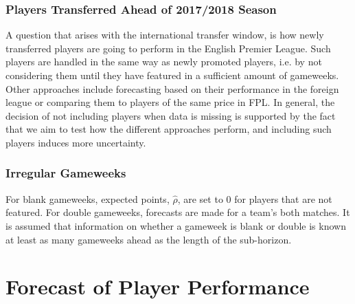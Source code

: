 \subsubsection{Players Transferred Ahead of 2017/2018 Season}
A question that arises with the international transfer window, is how newly transferred players are going to perform in the English Premier League. Such players are handled in the same way as newly promoted players, i.e. by not considering them until they have featured in a sufficient amount of gameweeks. Other approaches include forecasting based on their performance in the foreign league or comparing them to players of the same price in FPL. In general, the decision of not including players when data is missing is supported by the fact that we aim to test how the different approaches perform, and including such players induces more uncertainty. 



\subsubsection{Irregular Gameweeks}

For blank gameweeks, expected points, $\hat{\rho}$, are set to 0 for players that are not featured. For double gameweeks, forecasts are made for a team's both matches. It is assumed that information on whether a gameweek is blank or double is known at least as many gameweeks ahead as the length of the sub-horizon.


\section{Forecast of Player Performance}
\label{Exp_setup_Player_Performance_Prediction}


